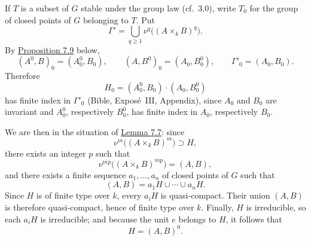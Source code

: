 If \(T\) is a subset of \(G\) stable under the group law
(cf.\ \(3.0\)), write \(T_0\) for the group of closed points of
\(G\) belonging to \(T\). Put
\[
  \Gamma'
    =\bigcup_{q\geq1}\nu^q\bigl((A\times_kB)^q\bigr).
\]
By \hyperref[prop:sga3-VIB-7.9]{Proposition 7.9} below,
\label{form:sga3-VIB-7.8-rational-commutators}%
\[
  (A^0,B)_0=(A_0^0,B_0),
  \qquad
  (A,B^0)_0=(A_0,B_0^0),
  \qquad
  \Gamma'_0=(A_0,B_0).
\]
Therefore
\[
  H_0=(A_0^0,B_0)\cdot(A_0,B_0^0)
\]
has finite index in \(\Gamma'_0\) (Bible, Expos\'e~III,
Appendix), since \(A_0\) and \(B_0\) are invariant and
\(A_0^0\), respectively \(B_0^0\), has finite index in
\(A_0\), respectively \(B_0\).

We are then in the situation of
\hyperref[lem:sga3-VIB-7.7]{Lemma 7.7}: since
\[
  \nu^m\bigl((A\times_kB)^m\bigr)\supset H,
\]
there exists an integer \(p\) such that
\[
  \nu^{mp}\bigl((A\times_kB)^{mp}\bigr)=(A,B),
\]
and there exists a finite sequence \(a_1,\ldots,a_n\) of closed
points of \(G\) such that
\[
  (A,B)=a_1H\cup\cdots\cup a_nH.
\]
Since \(H\) is of finite type over \(k\), every \(a_iH\) is
quasi-compact. Their union \((A,B)\) is therefore
quasi-compact, hence of finite type over \(k\). Finally, \(H\)
is irreducible, so each \(a_iH\) is irreducible; and because
the unit \(e\) belongs to \(H\), it follows that
\[
  H=(A,B)^0.
\]
